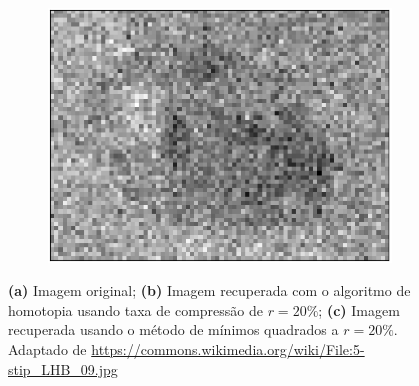 {\begin{figure}
\begin{subfigure}[b]{0.3\textwidth}
        \centering
        \includegraphics[scale=.35]{imagens/homotopy/joaninhaMMQ_20porcento.png}
        \caption{}
	    \label{fig:homotopy_40porc}
    \end{subfigure}
    \caption{{\bf (a)} Imagem original; {\bf (b)} Imagem recuperada com o algoritmo de homotopia usando taxa de compressão de $r = 20\%$; {\bf (c)} Imagem recuperada usando o método de mínimos quadrados a  $r = 20\%$. Adaptado de \small{\protect \url{https://commons.wikimedia.org/wiki/File:5-stip_LHB_09.jpg}} }
    \label{fig:homotopy}
\end{figure}
}
\clearpage